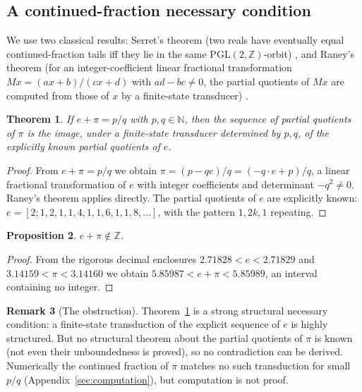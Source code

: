 \documentclass[11pt]{amsart}
\newtheorem{theorem}{Theorem}[section]
\newtheorem{proposition}[theorem]{Proposition}
\theoremstyle{definition}
\newtheorem{remark}[theorem]{Remark}
\theoremstyle{remark}
\numberwithin{equation}{section}
\newcommand{\Z}{\mathbb{Z}}
\newcommand{\N}{\mathbb{N}}
\newcommand{\ee}{e}
\begin{document}
\subsection{A continued-fraction necessary condition}

We use two classical results: Serret's theorem (two reals have eventually equal continued-fraction tails iff they lie in the same $\mathrm{PGL}(2,\Z)$-orbit) \cite{Panti2017}, and Raney's theorem (for an integer-coefficient linear fractional transformation $Mx=(ax+b)/(cx+d)$ with $ad-bc\ne0$, the partial quotients of $Mx$ are computed from those of $x$ by a finite-state transducer) \cite{Raney1973}.

\begin{theorem}\label{thm:cf}
If $e+\pi=p/q$ with $p,q\in\N$, then the sequence of partial quotients of $\pi$ is the image, under a finite-state transducer determined by $p,q$, of the explicitly known partial quotients of $\ee$.
\end{theorem}

\begin{proof}
From $e+\pi=p/q$ we obtain $\pi=(p-qe)/q=(-q\cdot e+p)/q$, a linear fractional transformation of $e$ with integer coefficients and determinant $-q^2\ne0$. Raney's theorem applies directly. The partial quotients of $\ee$ are explicitly known: $\ee=[2;1,2,1,1,4,1,1,6,1,1,8,\dots]$, with the pattern $1,2k,1$ repeating.
\end{proof}

\begin{proposition}\label{prop:not-integer}
$e+\pi\notin\Z$.
\end{proposition}

\begin{proof}
From the rigorous decimal enclosures $2.71828<e<2.71829$ and $3.14159<\pi<3.14160$ we obtain $5.85987<e+\pi<5.85989$, an interval containing no integer.
\end{proof}

\begin{remark}[The obstruction]
Theorem~\ref{thm:cf} is a strong structural necessary condition: a finite-state transduction of the explicit sequence of $\ee$ is highly structured. But no structural theorem about the partial quotients of $\pi$ is known (not even their unboundedness is proved), so no contradiction can be derived. Numerically the continued fraction of $\pi$ matches no such transduction for small $p/q$ (Appendix~\ref{sec:computation}), but computation is not proof.
\end{remark}
\end{document}
